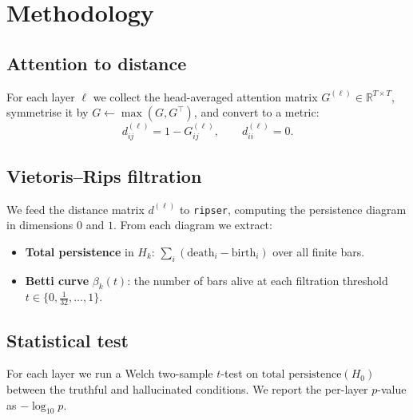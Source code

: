 \section{Methodology}
\subsection{Attention to distance}
For each layer $\ell$ we collect the head-averaged attention matrix
$G^{(\ell)}\in\mathbb{R}^{T\times T}$, symmetrise it by
$G \leftarrow \max(G, G^\top)$, and convert to a metric:
\begin{equation}
d^{(\ell)}_{ij} = 1 - G^{(\ell)}_{ij}, \qquad d^{(\ell)}_{ii}=0.
\end{equation}

\subsection{Vietoris--Rips filtration}
We feed the distance matrix $d^{(\ell)}$ to \texttt{ripser}, computing
the persistence diagram in dimensions $0$ and $1$. From each diagram
we extract:
\begin{itemize}
\item \textbf{Total persistence} in $H_k$: $\sum_i (\text{death}_i - \text{birth}_i)$
over all finite bars.
\item \textbf{Betti curve} $\beta_k(t)$: the number of bars alive at
each filtration threshold $t \in \{0, \tfrac{1}{32}, \dots, 1\}$.
\end{itemize}

\subsection{Statistical test}
For each layer we run a Welch two-sample $t$-test on
$\text{total persistence}(H_0)$ between the truthful and hallucinated
conditions. We report the per-layer $p$-value as
$-\log_{10} p$.
